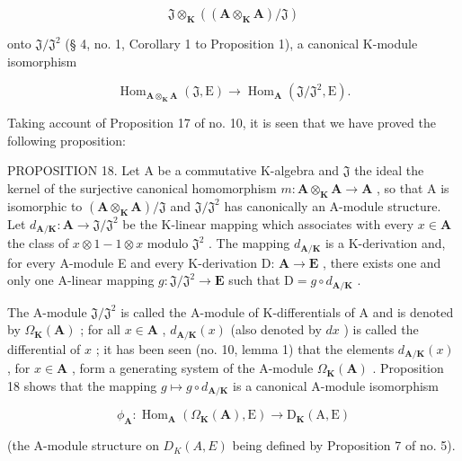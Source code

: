 \[
\mathfrak{J} \otimes_ {\mathbf {K}} ((\mathbf {A} \otimes_ {\mathbf {K}} \mathbf {A}) / \mathfrak{J})
\]

onto \(\mathfrak{J} / \mathfrak{J}^2\) (§ 4, no. 1, Corollary 1 to Proposition 1), a canonical K-module isomorphism

\[
\operatorname{Hom} _ {\mathbf {A} \otimes_ {\mathbf {K}} \mathbf {A}} (\mathfrak{J} , \mathrm{E}) \rightarrow \operatorname{Hom} _ {\mathbf {A}} (\mathfrak{J} / \mathfrak{J}^ {2}, \mathrm{E}).
\]

Taking account of Proposition 17 of no. 10, it is seen that we have proved the following proposition:

PROPOSITION 18. Let A be a commutative K-algebra and \(\mathfrak{J}\) the ideal the kernel of the surjective canonical homomorphism \(m: \mathbf{A} \otimes_{\mathbf{K}} \mathbf{A} \to \mathbf{A}\) , so that A is isomorphic to \((\mathbf{A} \otimes_{\mathbf{K}} \mathbf{A}) / \mathfrak{J}\) and \(\mathfrak{J} / \mathfrak{J}^2\) has canonically an A-module structure. Let \(d_{\mathbf{A} / \mathbf{K}}: \mathbf{A} \to \mathfrak{J} / \mathfrak{J}^2\) be the K-linear mapping which associates with every \(x \in \mathbf{A}\) the class of \(x \otimes 1 - 1 \otimes x\) modulo \(\mathfrak{J}^2\) . The mapping \(d_{\mathbf{A} / \mathbf{K}}\) is a K-derivation and, for every A-module E and every K-derivation D: \(\mathbf{A} \to \mathbf{E}\) , there exists one and only one A-linear mapping \(g: \mathfrak{J} / \mathfrak{J}^2 \to \mathbf{E}\) such that \(\mathrm{D} = g \circ d_{\mathbf{A} / \mathbf{K}}\) .

The A-module \(\mathfrak{J} / \mathfrak{J}^2\) is called the A-module of K-differentials of A and is denoted by \(\Omega_{\mathbf{K}}(\mathbf{A})\) ; for all \(x \in \mathbf{A}\) , \(d_{\mathbf{A} / \mathbf{K}}(x)\) (also denoted by \(dx\) ) is called the differential of \(x\) ; it has been seen (no. 10, lemma 1) that the elements \(d_{\mathbf{A} / \mathbf{K}}(x)\) , for \(x \in \mathbf{A}\) , form a generating system of the A-module \(\Omega_{\mathbf{K}}(\mathbf{A})\) . Proposition 18 shows that the mapping \(g \mapsto g \circ d_{\mathbf{A} / \mathbf{K}}\) is a canonical A-module isomorphism

\[
\phi_ {\mathbf {A}}: \operatorname{Hom} _ {\mathbf {A}} (\Omega_ {\mathbf {K}} (\mathbf {A}), \mathrm{E}) \rightarrow \mathrm{D} _ {\mathbf {K}} (\mathrm{A}, \mathrm{E})
\]

(the A-module structure on \(D_{K}(A, E)\) being defined by Proposition 7 of no. 5).

